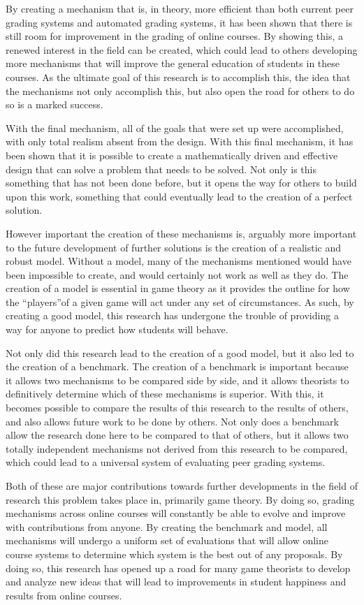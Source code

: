 \documentclass[12pt, Arial]{article}
\begin{document}
By creating a mechanism that is, in theory, more efficient than both current peer grading systems and automated grading systems, it has been shown that there is still room for improvement in the grading of online courses. By showing this, a renewed interest in the field can be created, which could lead to others developing more mechanisms that will improve the general education of students in these courses. As the ultimate goal of this research is to accomplish this, the idea that the mechanisms not only accomplish this, but also open the road for others to do so is a marked success.

With the final mechanism, all of the goals that were set up were accomplished, with only total realism absent from the design. With this final mechanism, it has been shown that it is possible to create a mathematically driven and effective design that can solve a problem that needs to be solved. Not only is this something that has not been done before, but it opens the way for others to build upon this work, something that could eventually lead to the creation of a perfect solution. 

However important the creation of these mechanisms is, arguably more important to the future development of further solutions is the creation of a realistic and robust model. Without a model, many of the mechanisms mentioned would have been impossible to create, and would certainly not work as well as they do. The creation of a model is essential in game theory as it provides the outline for how the ``players''of a given game will act under any set of circumstances. As such, by creating a good model, this research has undergone the trouble of providing a way for anyone to predict how students will behave. 

Not only did this research lead to the creation of a good model, but it also led to the creation of a benchmark. The creation of a benchmark is important because it allows two mechanisms to be compared side by side, and it allows theorists to definitively determine which of these mechanisms is superior. With this, it becomes possible to compare the results of this research to the results of others, and also allows future work to be done by others. Not only does a benchmark allow the research done here to be compared to that of others, but it allows two totally independent mechanisms not derived from this research to be compared, which could lead to a universal system of evaluating peer grading systems.

Both of these are major contributions towards further developments in the field of research this problem takes place in, primarily game theory. By doing so, grading mechanisms across online courses will constantly be able to evolve and improve with contributions from anyone. By creating the benchmark and model, all mechanisms will undergo a uniform set of evaluations that will allow online course systems to determine which system is the best out of any proposals. By doing so, this research has opened up a road for many game theorists to develop and analyze new ideas that will lead to improvements in student happiness and results from online courses.
\end{document}
